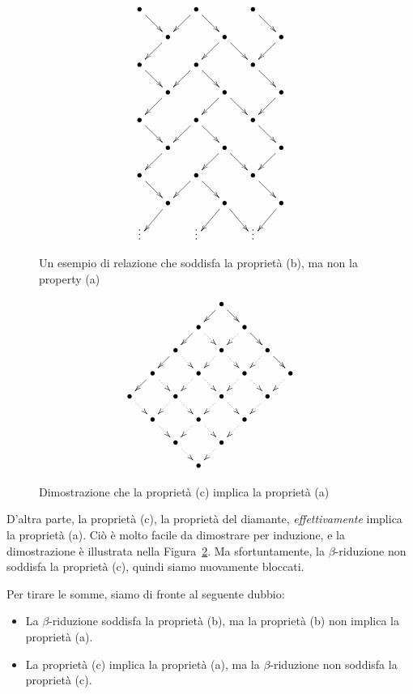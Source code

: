\documentclass{article}
\begin{document}
\begin{figure}
\[ \xymatrix@-1em{
  \bullet\ar[dr]&&\bullet\ar[dl]\ar[dr]&&\bullet\ar[dr] \\
  &\bullet\ar[dl]&&\bullet\ar[dl]\ar[dr]&&\bullet\ar[dl] \\
  \bullet\ar[dr]&&\bullet\ar[dl]\ar[dr]&&\bullet\ar[dr] \\
  &\bullet\ar[dl]&&\bullet\ar[dl]\ar[dr]&&\bullet\ar[dl] \\
  \bullet\ar[dr]&&\bullet\ar[dl]\ar[dr]&&\bullet\ar[dr] \\
  &\bullet\ar[dl]&&\bullet\ar[dl]\ar[dr]&&\bullet\ar[dl] \\
  \bullet\ar[dr]&&\bullet\ar[dl]\ar[dr]&&\bullet\ar[dr] \\
  &\bullet\ar[dl]&&\bullet\ar[dl]\ar[dr]&&\bullet\ar[dl] \\
  \vdots &&   \vdots &&   \vdots & 
  }
\]
\caption{Un esempio di relazione che soddisfa la propriet\`a (b), ma non la
  property (a)}
\label{fig-b-not-a}
\end{figure}

\begin{figure}
\[ \xymatrix@-1em@dr{
  \bullet\ar[r]\ar[d] & \bullet\ar[r]\ar@{.>}[d] & \bullet\ar[r]\ar@{.>}[d] &
  \bullet\ar@{.>}[d] \\
  \bullet\ar@{.>}[r]\ar[d] & \bullet\ar@{.>}[r]\ar@{.>}[d] & \bullet\ar@{.>}[r]\ar@{.>}[d] &
  \bullet\ar@{.>}[d] \\
  \bullet\ar@{.>}[r]\ar[d] & \bullet\ar@{.>}[r]\ar@{.>}[d] & \bullet\ar@{.>}[r]\ar@{.>}[d] &
  \bullet\ar@{.>}[d] \\
  \bullet\ar@{.>}[r]\ar[d] & \bullet\ar@{.>}[r]\ar@{.>}[d] & \bullet\ar@{.>}[r]\ar@{.>}[d] &
  \bullet\ar@{.>}[d] \\
  \bullet\ar@{.>}[r] & \bullet\ar@{.>}[r] & \bullet\ar@{.>}[r] &
  \bullet 
  }
\]
\caption{Dimostrazione che la propriet\`a (c) implica la propriet\`a (a)}
\label{fig-diamond-a}
\end{figure}

D'altra parte, la propriet\`a (c), la propriet\`a del diamante, {\em effettivamente} 
implica la propriet\`a (a). Ci\`o \`e molto facile da dimostrare per induzione, e
la dimostrazione \`e illustrata nella Figura~\ref{fig-diamond-a}. Ma sfortuntamente, la
$\beta$-riduzione non soddisfa la propriet\`a (c), quindi siamo nuovamente bloccati.

Per tirare le somme, siamo di fronte al seguente dubbio:
\begin{itemize}
\item La $\beta$-riduzione soddisfa la propriet\`a (b), ma la propriet\`a (b) non
  implica la propriet\`a (a).
\item La propriet\`a (c) implica la propriet\`a (a), ma la $\beta$-riduzione non
  soddisfa la propriet\`a (c).
\end{itemize}
\end{document}
